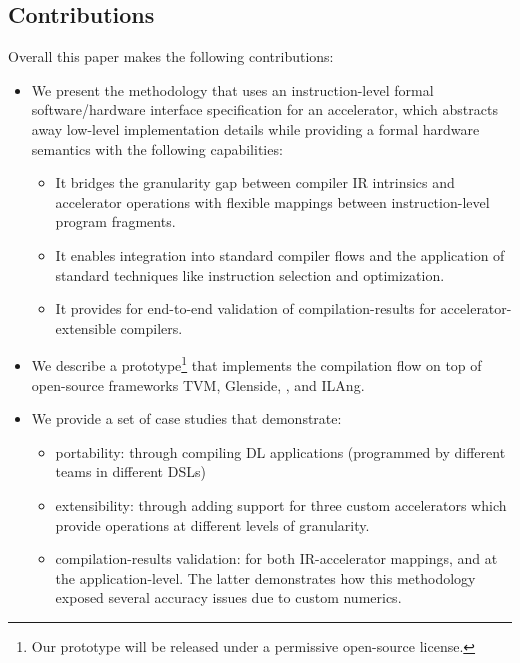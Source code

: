 \subsection{Contributions}

Overall this paper makes the following contributions:
%
\begin{itemize}[leftmargin=*]

  \item We present the {\TLA} methodology that uses an instruction-level formal software/hardware interface specification for an accelerator, which abstracts away low-level implementation details
  while providing a formal hardware semantics with the following capabilities:
  \begin{itemize}[leftmargin=*]
    \item It bridges the granularity gap between compiler IR intrinsics and accelerator operations with flexible mappings between instruction-level program fragments.

    \item It enables integration into standard compiler flows and the application of standard techniques like instruction selection and optimization.

    \item It provides for end-to-end validation of compilation-results for accelerator-extensible compilers.
  \end{itemize}

  \item We describe a prototype\footnote{%
  Our prototype will be 
  released under a permissive open-source license.
} that implements the {\TLA} compilation flow on top of open-source frameworks TVM, Glenside, \egg, and ILAng.

  \item We provide a set of case studies that demonstrate: 
  \begin{itemize}[leftmargin=*]
  
  \item portability: through compiling \AppNum DL applications (programmed by different teams in different DSLs) 
  
  \item extensibility: through adding support for three custom accelerators which provide operations at different levels of granularity.
  
  \item compilation-results validation: for both IR-accelerator mappings, and at the application-level. The latter demonstrates how this methodology exposed several accuracy issues due to custom numerics.
  \end{itemize}


\end{itemize}

